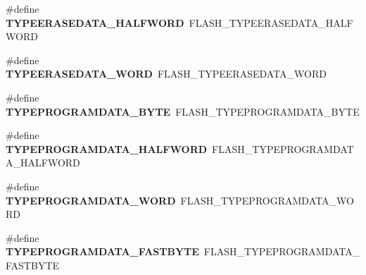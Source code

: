 \begin{DoxyCompactItemize}
\item 
\#define {\bfseries T\+Y\+P\+E\+E\+R\+A\+S\+E\+D\+A\+T\+A\+\_\+\+H\+A\+L\+F\+W\+O\+RD}~F\+L\+A\+S\+H\+\_\+\+T\+Y\+P\+E\+E\+R\+A\+S\+E\+D\+A\+T\+A\+\_\+\+H\+A\+L\+F\+W\+O\+RD\hypertarget{group___h_a_l___f_l_a_s_h___aliased___defines_gaaad85877529e61a7d77a294a9cf2d474}{}\label{group___h_a_l___f_l_a_s_h___aliased___defines_gaaad85877529e61a7d77a294a9cf2d474}

\item 
\#define {\bfseries T\+Y\+P\+E\+E\+R\+A\+S\+E\+D\+A\+T\+A\+\_\+\+W\+O\+RD}~F\+L\+A\+S\+H\+\_\+\+T\+Y\+P\+E\+E\+R\+A\+S\+E\+D\+A\+T\+A\+\_\+\+W\+O\+RD\hypertarget{group___h_a_l___f_l_a_s_h___aliased___defines_gaf4f4f8533550f97be0c26f73d57c7287}{}\label{group___h_a_l___f_l_a_s_h___aliased___defines_gaf4f4f8533550f97be0c26f73d57c7287}

\item 
\#define {\bfseries T\+Y\+P\+E\+P\+R\+O\+G\+R\+A\+M\+D\+A\+T\+A\+\_\+\+B\+Y\+TE}~F\+L\+A\+S\+H\+\_\+\+T\+Y\+P\+E\+P\+R\+O\+G\+R\+A\+M\+D\+A\+T\+A\+\_\+\+B\+Y\+TE\hypertarget{group___h_a_l___f_l_a_s_h___aliased___defines_ga6864697548b848a7fc44453e1a2fb81c}{}\label{group___h_a_l___f_l_a_s_h___aliased___defines_ga6864697548b848a7fc44453e1a2fb81c}

\item 
\#define {\bfseries T\+Y\+P\+E\+P\+R\+O\+G\+R\+A\+M\+D\+A\+T\+A\+\_\+\+H\+A\+L\+F\+W\+O\+RD}~F\+L\+A\+S\+H\+\_\+\+T\+Y\+P\+E\+P\+R\+O\+G\+R\+A\+M\+D\+A\+T\+A\+\_\+\+H\+A\+L\+F\+W\+O\+RD\hypertarget{group___h_a_l___f_l_a_s_h___aliased___defines_ga0064d23e04c71357067fc6d55c4ef2d1}{}\label{group___h_a_l___f_l_a_s_h___aliased___defines_ga0064d23e04c71357067fc6d55c4ef2d1}

\item 
\#define {\bfseries T\+Y\+P\+E\+P\+R\+O\+G\+R\+A\+M\+D\+A\+T\+A\+\_\+\+W\+O\+RD}~F\+L\+A\+S\+H\+\_\+\+T\+Y\+P\+E\+P\+R\+O\+G\+R\+A\+M\+D\+A\+T\+A\+\_\+\+W\+O\+RD\hypertarget{group___h_a_l___f_l_a_s_h___aliased___defines_ga97f70e9304478e184521f9e9e209fb38}{}\label{group___h_a_l___f_l_a_s_h___aliased___defines_ga97f70e9304478e184521f9e9e209fb38}

\item 
\#define {\bfseries T\+Y\+P\+E\+P\+R\+O\+G\+R\+A\+M\+D\+A\+T\+A\+\_\+\+F\+A\+S\+T\+B\+Y\+TE}~F\+L\+A\+S\+H\+\_\+\+T\+Y\+P\+E\+P\+R\+O\+G\+R\+A\+M\+D\+A\+T\+A\+\_\+\+F\+A\+S\+T\+B\+Y\+TE\hypertarget{group___h_a_l___f_l_a_s_h___aliased___defines_gabe017e7fb8bbfcb3e2c085ec36a74413}{}\label{group___h_a_l___f_l_a_s_h___aliased___defines_gabe017e7fb8bbfcb3e2c085ec36a74413}


\end{DoxyCompactItemize}
